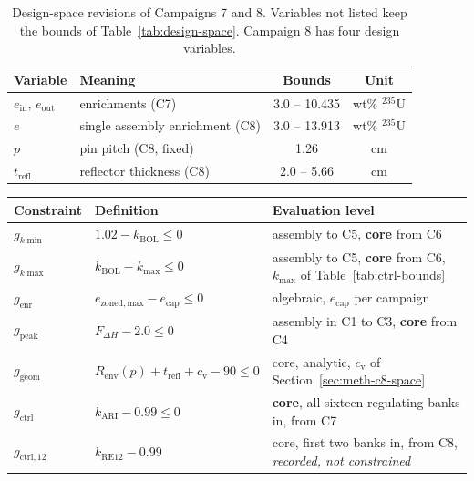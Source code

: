 \begin{table}[htbp]
  \centering
  \caption{Design-space revisions of Campaigns 7 and 8. Variables not
  listed keep the bounds of Table~\ref{tab:design-space}. Campaign 8
  has four design variables.}
  \label{tab:design-space-c78}
  \begin{tabular}{llcc}
    \toprule
    Variable & Meaning & Bounds & Unit \\
    \midrule
    $e_\mathrm{in},\,e_\mathrm{out}$ & enrichments (C7)
      & 3.0 -- 10.435 & wt\% $^{235}$U \\
    $e$ & single assembly enrichment (C8)
      & 3.0 -- 13.913 & wt\% $^{235}$U \\
    $p$ & pin pitch (C8, fixed) & 1.26 & cm \\
    $t_\mathrm{refl}$ & reflector thickness (C8) & 2.0 -- 5.66 & cm \\
    \bottomrule
  \end{tabular}
\end{table}

  \begin{tabular}{lll}
    \toprule
    Constraint & Definition & Evaluation level \\
    \midrule
    $g_{k\min}$       & $1.02 - k_\mathrm{BOL} \le 0$                      & assembly to C5, \textbf{core} from C6 \\
    $g_{k\max}$       & $k_\mathrm{BOL} - k_{\max} \le 0$                  & assembly to C5, \textbf{core} from C6, $k_{\max}$ of Table~\ref{tab:ctrl-bounds} \\
    $g_\mathrm{enr}$  & $e_\mathrm{zoned,max} - e_\mathrm{cap} \le 0$      & algebraic, $e_\mathrm{cap}$ per campaign \\
    $g_\mathrm{peak}$ & $F_{\Delta H} - 2.0 \le 0$                         & assembly in C1 to C3, \textbf{core} from C4 \\
    $g_\mathrm{geom}$ & $R_\mathrm{env}(p) + t_\mathrm{refl} + c_\mathrm{v} - 90 \le 0$ & core, analytic, $c_\mathrm{v}$ of Section~\ref{sec:meth-c8-space} \\
    $g_\mathrm{ctrl}$ & $k_\mathrm{ARI} - 0.99 \le 0$                      & \textbf{core}, all sixteen regulating banks in, from C7 \\
    $g_\mathrm{ctrl,12}$ & $k_\mathrm{RE12} - 0.99$                        & core, first two banks in, from C8, \emph{recorded, not constrained} \\
    \bottomrule
  \end{tabular}

